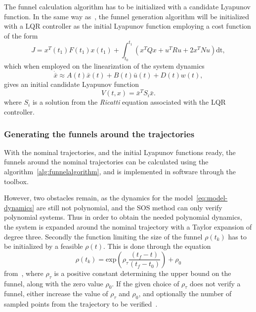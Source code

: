 The funnel calculation algorithm has to be initialized with a candidate Lyapunov
function. In the same way
as~\cite[Majumdar]{majumdarFunnelLibrariesRealtime2017}, the funnel generation
algorithm will be initialized with a \ac{LQR} controller as the initial Lyapunov
function employing a cost function of the form
\begin{equation}
  J = x^{T}(t_1)F(t_1)x(t_1) + \int_{t_{0}}^{t_{1}} \left( x^{T}Qx + u^{T}Ru + 2x^TNu \right) \mathrm{dt},
\end{equation}
which when employed on the linearization of the system dynamics
\begin{equation}
  \dot{\bar{x}} \approx A(t)\bar{x}(t) + B(t)\bar{u}(t) +D(t)w(t),
\end{equation}
gives an initial candidate Lyapunov function
\begin{equation}
  V(t,x) = {\bar{x}}^{T}S_{i}\bar{x}.
\end{equation}
where \(S_{i}\) is a solution from the \textit{Ricatti} equation associated with
the \ac{LQR} controller.

\subsubsection{Generating the funnels around the trajectories}
\label{subsec:generating-funnels}

With the nominal trajectories, and the initial Lyapunov functions ready, the
funnels around the nominal trajectories can be calculated using the
algorithm~\ref{alg:funnelalgorithm}, and is implemented in software through the
~\cite[sostools]{sostools} toolbox.

However, two obstacles remain, as the dynamics for the
model~\ref{eq:model-dynamics} are still not polynomial, and the \ac{SOS} method
can only verify polynomial systems. Thus in order to obtain the needed
polynomial dynamics, the system is expanded around the nominal trajectory with a
Taylor expansion of degree three. Secondly the function limiting the size of the
funnel \(\rho(t_{k})\) has to be initialized by a feasible \(\rho(t)\). This is
done through the equation
\begin{equation}
  \rho(t_{k}) = \mathrm{exp}\left( \rho_{\tau}\frac{\left( t_{f} - t \right)}{\left( t_{f} - t_{0}  \right)}\right) + \rho_0
\end{equation}
from~\cite[eq.~6.sec~3]{tobenkinInvariantFunnelsTrajectories2010}, where
\(\rho_{\tau}\) is a positive constant determining the upper bound on the
funnel, along with the zero value \(\rho_0\). If the given choice of
\(\rho_{\tau}\) does not verify a funnel, either increase the value of
\(\rho_{\tau}\) and \(\rho_0\), and optionally the number of sampled points from
the trajectory to be verified~\cite{tobenkinInvariantFunnelsTrajectories2010}.


